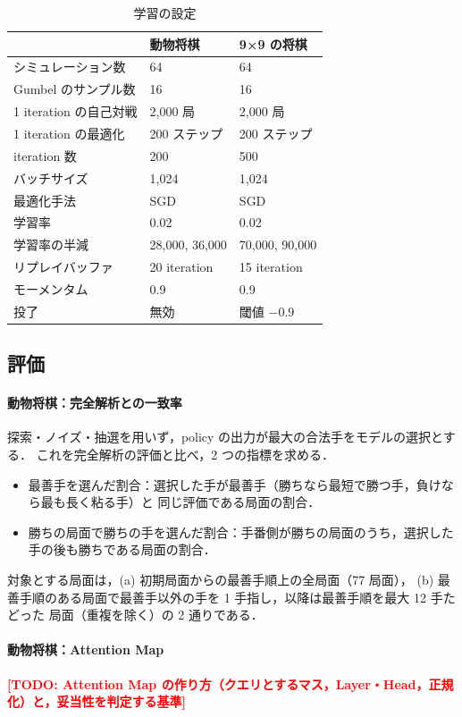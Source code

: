 \documentclass[a4paper,10pt,twocolumn]{ltjsarticle}
\newcommand{\todo}[1]{\textcolor{red}{\textbf{[TODO: #1]}}}
\begin{document}
\begin{table}[htbp]
  \centering\small
  \caption{学習の設定}
  \label{tab:train}
  \footnotesize
  \begin{tabular}{lll}
    \toprule
    & 動物将棋 & 9×9 の将棋 \\
    \midrule
    シミュレーション数 & 64 & 64 \\
    Gumbel のサンプル数 & 16 & 16 \\
    1 iteration の自己対戦 & 2,000 局 & 2,000 局 \\
    1 iteration の最適化 & 200 ステップ & 200 ステップ \\
    iteration 数 & 200 & 500 \\
    バッチサイズ & 1,024 & 1,024 \\
    最適化手法 & SGD & SGD \\
    学習率 & 0.02 & 0.02 \\
    学習率の半減 & 28,000, 36,000 & 70,000, 90,000 \\
    リプレイバッファ & 20 iteration & 15 iteration \\
    モーメンタム & 0.9 & 0.9 \\
    投了 & 無効 & 閾値 $-0.9$ \\
    \bottomrule
  \end{tabular}
\end{table}

\subsection{評価}
\paragraph{動物将棋：完全解析との一致率}
探索・ノイズ・抽選を用いず，policy の出力が最大の合法手をモデルの選択とする．
これを完全解析の評価と比べ，2 つの指標を求める．
\begin{itemize}
  \item 最善手を選んだ割合：選択した手が最善手（勝ちなら最短で勝つ手，負けなら最も長く粘る手）と
    同じ評価である局面の割合．
  \item 勝ちの局面で勝ちの手を選んだ割合：手番側が勝ちの局面のうち，選択した手の後も勝ちである局面の割合．
\end{itemize}
対象とする局面は，(a) 初期局面からの最善手順上の全局面（77 局面），
(b) 最善手順のある局面で最善手以外の手を 1 手指し，以降は最善手順を最大 12 手たどった
局面（重複を除く）の 2 通りである．

\paragraph{動物将棋：Attention Map}
\todo{Attention Map の作り方（クエリとするマス，Layer・Head，正規化）と，妥当性を判定する基準}
\end{document}
